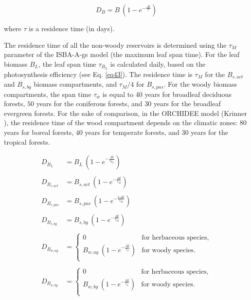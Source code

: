 {\begin{equation}
D_B = B \: (1-e^{-\frac{\Delta t}{\tau}})
\label{eqdeclingen}
\end{equation}

where $\tau$ is a residence time (in days).

The residence time of all the non-woody reservoirs is determined using the 
$\tau_M$ parameter of the ISBA-A-gs model (the maximum leaf span time).
For the leaf biomass $B_L$, the leaf span time $\tau_{B_L}$ is calculated daily, 
based on the photosynthesis efficiency (see Eq. \ref{eq43}).
The residence time is $\tau_M$ for the $B_{s,act}$ 
and $B_{s,bg}$ biomass compartments, and $\tau_M / 4$ for $B_{s,pas}$.
For the woody biomass compartments, the span time 
$\tau_w$ is equal to $40$ years for broadleaf deciduous forests, 
$50$ years for the coniferous forests, and 
$30$ years for the broadleaf evergreen forests.
For the sake of comparison, in the ORCHIDEE model (Krinner ), 
the residence time of the wood compartment 
depends on the climatic zones: $80$ years for boreal forests, 
$40$ years for temperate forests, and $30$ years for the 
tropical forests.


\begin{equation}
\begin{array}{ll}
D_{B_L}       & = B_L \: (1-e^{-\frac{\Delta t}{\tau_{B_L}}}) \\
 \\
D_{B_{s,act}} & = B_{s,act} \: (1-e^{-\frac{\Delta t}{\tau_M}}) \\
 \\
D_{B_{s,pas}} & = B_{s,pas} \: (1-e^{-\frac{4 \: \Delta t}{\tau_M}}) \\
 \\
D_{B_{s,bg}}  & = B_{s,bg} \: (1-e^{-\frac{\Delta t}{\tau_M}}) \\
 \\
D_{B_{w,ag}}  & =    \left\{ 
  \begin{array}{ll}
    0                                            & \mbox{for herbaceous species,} \\
    B_{w,ag} \: (1-e^{-\frac{\Delta t}{\tau_w}}) & \mbox{for woody species.} \\
  \end{array}
                  \right. \\
 \\
D_{B_{w,bg}}  & =    \left\{ 
  \begin{array}{ll}
    0                                            & \mbox{for herbaceous species,} \\
    B_{w,bg} \: (1-e^{-\frac{\Delta t}{\tau_w}}) & \mbox{for woody species.} \\
  \end{array}
                  \right. \\
\end{array}
\label{eqdeclin}
\end{equation}


}

